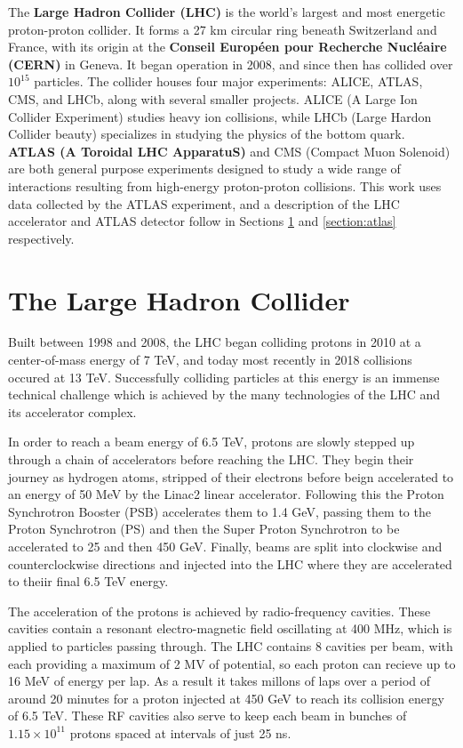 \label{chapter:lhcatlas}

The \textbf{Large Hadron Collider (LHC)} is the world's largest and most energetic proton-proton collider. It forms a 27 km circular ring beneath Switzerland and France, with its origin at the \textbf{Conseil Européen pour Recherche Nucléaire (CERN)} in Geneva. It began operation in 2008, and since then has collided over $10^{15}$ particles. The collider houses four major experiments: ALICE, ATLAS, CMS, and LHCb, along with several smaller projects. ALICE (A Large Ion Collider Experiment) studies heavy ion collisions, while LHCb (Large Hardon Collider beauty) specializes in studying the physics of the bottom quark. \textbf{ATLAS (A Toroidal LHC ApparatuS)} and CMS (Compact Muon Solenoid) are both general purpose experiments designed to study a wide range of interactions resulting from high-energy proton-proton collisions. This work uses data collected by the ATLAS experiment, and a description of the LHC accelerator and ATLAS detector follow in Sections \ref{section:lhc} and \ref{section:atlas} respectively.

\section{The Large Hadron Collider}
\label{section:lhc}
Built between 1998 and 2008, the LHC began colliding protons in 2010 at a center-of-mass energy of 7 TeV, and today most recently in 2018 collisions occured at 13 TeV. Successfully colliding particles at this energy is an immense technical challenge which is achieved by the many technologies of the LHC and its accelerator complex.

In order to reach a beam energy of 6.5 TeV, protons are slowly stepped up through a chain of accelerators before reaching the LHC. They begin their journey as hydrogen atoms, stripped of their electrons before beign accelerated to an energy of 50 MeV by the Linac2 linear accelerator. Following this the Proton Synchrotron Booster (PSB) accelerates them to 1.4 GeV, passing them to the Proton Synchrotron (PS) and then the Super Proton Synchrotron to be accelerated to 25 and then 450 GeV. Finally, beams are split into clockwise and counterclockwise directions and injected into the LHC where they are accelerated to theiir final 6.5 TeV energy.

The acceleration of the protons is achieved by radio-frequency cavities. These cavities contain a resonant electro-magnetic field oscillating at 400 MHz, which is applied to particles passing through. The LHC contains 8 cavities per beam, with each providing a maximum of 2 MV of potential, so each proton can recieve up to 16 MeV of energy per lap. As a result it takes millons of laps over a period of around 20 minutes for a proton injected at 450 GeV to reach its collision energy of 6.5 TeV.  These RF cavities also serve to keep each beam in bunches of $1.15 \times 10^{11}$ protons spaced at intervals of just 25 ns.

